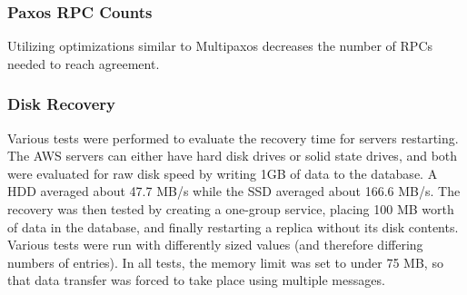 \documentclass[letterpaper,10pt]{article}
\begin{document}
\subsubsection{Paxos RPC Counts}

Utilizing optimizations similar to Multipaxos decreases the number of RPCs needed to reach agreement.

\begin{table}[h]
\centering
{}
\end{table}

\subsubsection{Disk Recovery}
Various tests were performed to evaluate the recovery time for servers restarting.  The AWS servers can either have hard disk drives or solid state drives, and both were evaluated for raw disk speed by writing 1GB of data to the database.  A HDD averaged about 47.7 MB/s while the SSD averaged about 166.6 MB/s.  The recovery was then tested by creating a one-group service, placing 100 MB worth of data in the database, and finally restarting a replica without its disk contents.  Various tests were run with differently sized values (and therefore differing numbers of entries).  In all tests, the memory limit was set to under 75 MB, so that data transfer was forced to take place using multiple messages.
\end{document}
